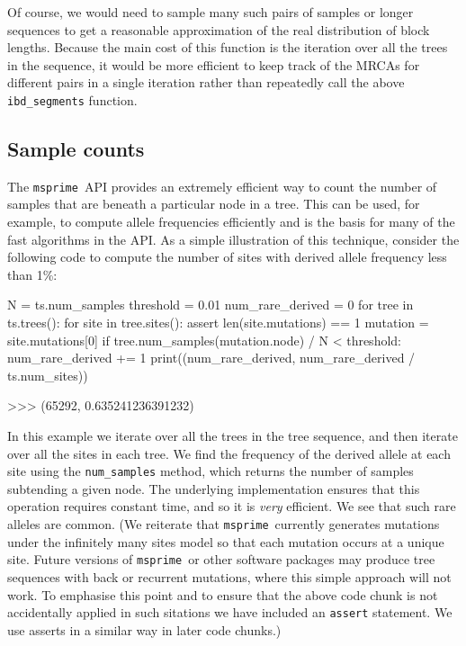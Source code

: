 \documentclass[graybox]{svmult}
\newcommand{\msprime}[0]{\texttt{msprime}}
\begin{document}
Of course, we would need to sample many such pairs of samples or longer sequences to get a reasonable approximation of the real distribution of block lengths.
Because the main cost of this function is the iteration over all the
trees in the sequence, it would be more efficient to keep track of the MRCAs
for different pairs in a single iteration rather than repeatedly
call the above \texttt{ibd\_segments} function.

\subsection{Sample counts}\label{sample-counts}

The \msprime\ API provides an extremely efficient way to count the number of samples that are beneath a particular node in a tree. This can be used,
for example, to compute allele frequencies efficiently and is the basis
for many of the fast algorithms in the API. As a simple illustration of
this technique, consider the following code to compute the number of
sites with derived allele frequency less than 1\%:

\begin{pythoncode}
N = ts.num_samples
threshold = 0.01
num_rare_derived = 0
for tree in ts.trees():
    for site in tree.sites():
        assert len(site.mutations) == 1
        mutation = site.mutations[0]
        if tree.num_samples(mutation.node) / N < threshold:
            num_rare_derived += 1
print((num_rare_derived, num_rare_derived / ts.num_sites))

>>> (65292, 0.635241236391232)
\end{pythoncode}

    In this example we iterate over all the trees in the tree sequence, and
then iterate over all the sites in each tree. We find the frequency
of the derived allele at each site using the \texttt{num\_samples}
method, which returns the number of samples subtending a given
node. The underlying implementation ensures that this operation requires
constant time, and so it is \emph{very} efficient. We see that such rare alleles are common.
(We reiterate that \msprime\ currently
generates mutations under the infinitely many sites model so that each mutation occurs at a
unique site. Future versions of \msprime\ or other software packages may produce
tree sequences with back or recurrent mutations, where
this simple approach will not work.
To emphasise this point and to ensure that the above code chunk is not
accidentally applied in such sitations we have included an
\texttt{assert} statement. We use asserts in a similar way in later
code chunks.)
\end{document}
